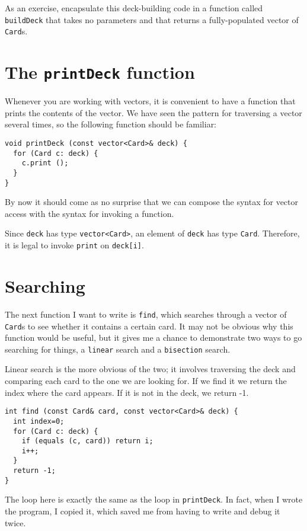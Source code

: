 
As an exercise, encapsulate this deck-building code in a function called
{\tt buildDeck} that takes no parameters and that returns a
fully-populated vector of {\tt Card}s.

\section{The {\tt printDeck} function}
\label{printdeck}

Whenever you are working with vectors, it is convenient to have
a function that prints the contents of the vector.  We have
seen the pattern for traversing a vector several times, so the
following function should be familiar:

\begin{lstlisting}
void printDeck (const vector<Card>& deck) {
  for (Card c: deck) {
    c.print ();
  }
}
\end{lstlisting}
%
By now it should come as no surprise that we can compose the
syntax for vector access with the syntax for invoking a function.

Since {\tt deck} has type {\tt vector<Card>}, an element of {\tt deck}
has type {\tt Card}.  Therefore, it is legal to invoke {\tt print}
on {\tt deck[i]}.

\section{Searching}
\label{find}

The next function I want to write is {\tt find}, which searches
through a vector of {\tt Card}s to see whether it contains a certain
card.  It may not be obvious why this function would be useful, but it
gives me a chance to demonstrate two ways to go searching for things,
a {\tt linear} search and a {\tt bisection} search.


Linear search is the more obvious of the two; it involves traversing
the deck and comparing each card to the one we are looking for.  If we
find it we return the index where the card appears.  If it is not in
the deck, we return -1.

\begin{lstlisting}
int find (const Card& card, const vector<Card>& deck) {
  int index=0;
  for (Card c: deck) {
    if (equals (c, card)) return i;
    i++;
  }
  return -1;
}
\end{lstlisting}
%
The loop here is exactly the same as the loop in {\tt printDeck}.
In fact, when I wrote the program, I copied it, which saved me
from having to write and debug it twice.

